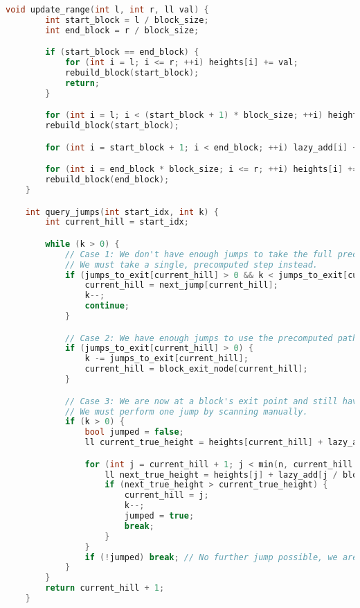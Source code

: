 \documentclass[12pt]{article}
\begin{document}
\begin{itemize}
{\begin{lstlisting}[language=C++, basicstyle=\ttfamily\fontsize{7pt}{8pt}\selectfont]
    void update_range(int l, int r, ll val) {
        int start_block = l / block_size;
        int end_block = r / block_size;

        if (start_block == end_block) {
            for (int i = l; i <= r; ++i) heights[i] += val;
            rebuild_block(start_block);
            return;
        }

        for (int i = l; i < (start_block + 1) * block_size; ++i) heights[i] += val;
        rebuild_block(start_block);

        for (int i = start_block + 1; i < end_block; ++i) lazy_add[i] += val;

        for (int i = end_block * block_size; i <= r; ++i) heights[i] += val;
        rebuild_block(end_block);
    }

    int query_jumps(int start_idx, int k) {
        int current_hill = start_idx;

        while (k > 0) {
            // Case 1: We don't have enough jumps to take the full precomputed path
            // We must take a single, precomputed step instead.
            if (jumps_to_exit[current_hill] > 0 && k < jumps_to_exit[current_hill]) {
                current_hill = next_jump[current_hill];
                k--;
                continue;
            }

            // Case 2: We have enough jumps to use the precomputed path.
            if (jumps_to_exit[current_hill] > 0) {
                k -= jumps_to_exit[current_hill];
                current_hill = block_exit_node[current_hill];
            }

            // Case 3: We are now at a block's exit point and still have jumps left
            // We must perform one jump by scanning manually.
            if (k > 0) {
                bool jumped = false;
                ll current_true_height = heights[current_hill] + lazy_add[current_hill / block_size];

                for (int j = current_hill + 1; j < min(n, current_hill + 1 + MAX_JUMP_DIST); ++j) {
                    ll next_true_height = heights[j] + lazy_add[j / block_size];
                    if (next_true_height > current_true_height) {
                        current_hill = j;
                        k--;
                        jumped = true;
                        break;
                    }
                }
                if (!jumped) break; // No further jump possible, we are stuck.
            }
        }
        return current_hill + 1;
    }


\end{lstlisting}}
\end{itemize}
\end{document}
